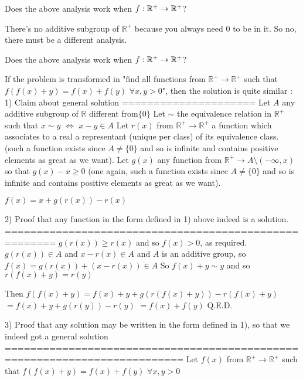 


\begin{solution}
	Does the above analysis work when $f:\Bbb{R}^+\to \Bbb{R}^+$?
\end{solution}



\begin{solution}
	There's no additive subgroup of $\mathbb{R}^{+}$ because you always need $0$ to be in it.  So no, there must be a different analysis.
\end{solution}



\begin{solution}
	\begin{tcolorbox}Does the above analysis work when $f:\Bbb{R}^+\to \Bbb{R}^+$?\end{tcolorbox}
If the problem is transformed in "find all functions from $\mathbb R^+\to\mathbb R^+$ such that $f(f(x)+y)=f(x)+f(y)$ $\forall x,y>0$", then the solution is quite similar :
1) Claim about general solution
=====================
Let $A$ any additive subgroup of $\mathbb R$ different from$\{0\}$
Let $\sim$ the equivalence relation in $\mathbb R^+$ such that $x\sim y$ $\iff$ $x-y\in A$
Let $r(x)$ from $\mathbb R^+\to\mathbb R^+$ a function which associates to a real a representant (unique per class) of its equivalence class. (such a function exists since $A\ne\{0\}$ and so is infinite and contains positive elements as great as we want).
Let $g(x)$ any function from $\mathbb R^+\to A\setminus(-\infty,x)$ so that $g(x)-x\ge 0$ (one again, such a function exists since $A\ne\{0\}$ and so is infinite and contains positive elements as great as we want).

$f(x)=x+g(r(x))-r(x)$

2) Proof that any function in the form defined in 1) above indeed is a solution.
======================================================
$g(r(x))\ge r(x)$ and so $f(x)>0$, as required.
$g(r(x))\in A$ and $x-r(x)\in A$ and $A$ is an additive group, so $f(x)=g(r(x))+(x-r(x))\in A$
So $f(x)+y\sim y$ and so $r(f(x)+y)=r(y)$

Then $f(f(x)+y)=f(x)+y+g(r(f(x)+y))-r(f(x)+y)$ $=f(x)+y+g(r(y))-r(y)$ $=f(x)+f(y)$
Q.E.D.

3) Proof that any solution may be written in the form defined in 1), so that we indeed got a general solution
==========================================================================
Let $f(x)$ from $\mathbb R^+\to\mathbb R^+$ such that $f(f(x)+y)=f(x)+f(y)$ $\forall x,y>0$


\end{solution}
